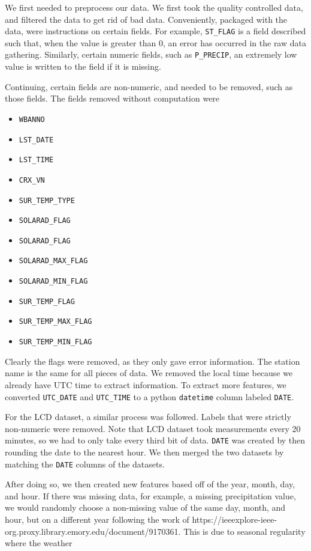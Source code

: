 \documentclass[../report.tex]{subfiles}
\begin{document}
We first needed to preprocess our data.
We first took the quality controlled data, and filtered the data to get rid of bad data.
Conveniently, packaged with the data, were instructions on certain fields.
For example, \verb|ST_FLAG| is a field described such that, when the value is greater than 0, an error has occurred in the raw data gathering.
Similarly, certain numeric fields, such as \verb|P_PRECIP|, an extremely low value is written to the field if it is missing.

Continuing, certain fields are non-numeric, and needed to be removed, such as those fields.
The fields removed without computation were

\begin{itemize}
    \item \verb|WBANNO|
    \item \verb|LST_DATE|
    \item \verb|LST_TIME|
    \item \verb|CRX_VN|
    \item \verb|SUR_TEMP_TYPE|
    \item \verb|SOLARAD_FLAG|
    \item \verb|SOLARAD_FLAG|
    \item \verb|SOLARAD_MAX_FLAG|
    \item \verb|SOLARAD_MIN_FLAG|
    \item \verb|SUR_TEMP_FLAG|
    \item \verb|SUR_TEMP_MAX_FLAG|
    \item \verb|SUR_TEMP_MIN_FLAG|
\end{itemize}
Clearly the flags were removed, as they only gave error information.
The station name is the same for all pieces of data.
We removed the local time because we already have UTC time to extract information.
To extract more features, we converted \verb|UTC_DATE| and \verb|UTC_TIME| to a python \verb|datetime| column labeled \verb|DATE|.

For the LCD dataset, a similar process was followed.
Labels that were strictly non-numeric were removed.
Note that LCD dataset took measurements every 20 minutes, so we had to only take every third bit of data.
\verb|DATE| was created by then rounding the date to the nearest hour.
We then merged the two datasets by matching the \verb|DATE| columns of the datasets.

After doing so, we then created new features based off of the year, month, day, and hour.
If there was missing data, for example, a missing precipitation value, we would randomly choose a non-missing value of the same day, month, and hour, but on a different year following the work of https://ieeexplore-ieee-org.proxy.library.emory.edu/document/9170361. 
This is due to seasonal regularity where the weather 
\end{document}
